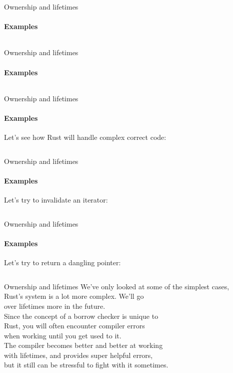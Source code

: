 \documentclass[usenames,dvipsnames,10pt,aspectratio=169]{beamer}
\begin{document}
\begin{frame}{Ownership and lifetimes}
	\framesubtitle{Examples}
	\inputminted[fontsize=\large]{rust}{code/own5.rs}
\end{frame}

\begin{frame}{Ownership and lifetimes}
	\framesubtitle{Examples}
	\inputminted[fontsize=\large]{rust}{code/own6.rs}
\end{frame}

\begin{frame}{Ownership and lifetimes}
	\framesubtitle{Examples}
	Let's see how Rust will handle complex correct code:
	\vspace{0.1cm}
	\inputminted[fontsize=\normalsize]{rust}{code/own7.rs}
	\vspace{0.5cm}
\end{frame}

\begin{frame}{Ownership and lifetimes}
	\framesubtitle{Examples}
	\large
	Let's try to invalidate an iterator:
	\vspace{0.3cm}
	\inputminted[fontsize=\large]{rust}{code/own8.rs}
	\vspace{0.5cm}
\end{frame}

\begin{frame}{Ownership and lifetimes}
	\framesubtitle{Examples}
	\large
	Let's try to return a dangling pointer:
	\vspace{0.3cm}
	\inputminted[fontsize=\large]{rust}{code/own9.rs}
	\vspace{0.5cm}
\end{frame}

\begin{frame}{Ownership and lifetimes}
\large	
We've only looked at some of the simplest cases,\\
Rust's system is a lot more complex. We'll go\\
over lifetimes more in the future.\\
\vspace{0.4cm}
Since the concept of a borrow checker is unique to\\
Rust, you will often encounter compiler errors\\
when working until you get used to it.\\
\vspace{0.4cm}
The compiler becomes better and better at working\\
with lifetimes, and provides super helpful errors,\\
but it still can be stressful to fight with it sometimes.
\end{frame}
\end{document}
